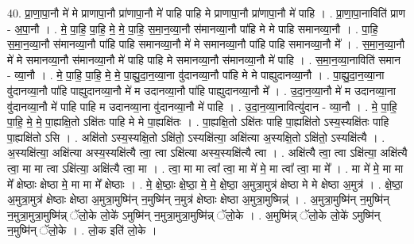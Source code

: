 \documentclass[17pt]{extarticle}
\begin{document}
40. प्रा॒णा॒पा॒नौ मे॑ मे प्राणापा॒नौ प्रा॑णापा॒नौ मे॑ पाहि पाहि मे प्राणापा॒नौ प्रा॑णापा॒नौ मे॑ पाहि । . प्रा॒णा॒पा॒नाविति॑ प्राण - अ॒पा॒नौ । . मे॒ पा॒हि॒ पा॒हि॒ मे॒ मे॒ पा॒हि॒ स॒मा॒न॒व्या॒नौ स॑मानव्या॒नौ पा॑हि मे मे पाहि समानव्या॒नौ । . पा॒हि॒ स॒मा॒न॒व्या॒नौ स॑मानव्या॒नौ पा॑हि पाहि समानव्या॒नौ मे॑ मे समानव्या॒नौ पा॑हि पाहि समानव्या॒नौ मे᳚ । . स॒मा॒न॒व्या॒नौ मे॑ मे समानव्या॒नौ स॑मानव्या॒नौ मे॑ पाहि पाहि मे समानव्या॒नौ स॑मानव्या॒नौ मे॑ पाहि । . स॒मा॒न॒व्या॒नाविति॑ समान - व्या॒नौ । . मे॒ पा॒हि॒ पा॒हि॒ मे॒ मे॒ पा॒ह्यु॒दा॒न॒व्या॒ना वु॑दानव्या॒नौ पा॑हि मे मे पाह्युदानव्या॒नौ । . पा॒ह्यु॒दा॒न॒व्या॒ना वु॑दानव्या॒नौ पा॑हि पाह्युदानव्या॒नौ मे॑ म उदानव्या॒नौ पा॑हि पाह्युदानव्या॒नौ मे᳚ । . उ॒दा॒न॒व्या॒नौ मे॑ म उदानव्या॒ना वु॑दानव्या॒नौ मे॑ पाहि पाहि म उदानव्या॒ना वु॑दानव्या॒नौ मे॑ पाहि । . उ॒दा॒न॒व्या॒नावित्यु॑दान - व्या॒नौ । . मे॒ पा॒हि॒ पा॒हि॒ मे॒ मे॒ पा॒ह्यक्षि॒तो ऽक्षि॑तः पाहि मे मे पा॒ह्यक्षि॑तः । . पा॒ह्यक्षि॒तो ऽक्षि॑तः पाहि पा॒ह्यक्षि॑तो ऽस्य॒स्यक्षि॑तः पाहि पा॒ह्यक्षि॑तो ऽसि । . अक्षि॑तो ऽस्य॒स्यक्षि॒तो ऽक्षि॑तो॒ ऽस्यक्षि॑त्या॒ अक्षि॑त्या अ॒स्यक्षि॒तो ऽक्षि॑तो॒ ऽस्यक्षि॑त्यै । . अ॒स्यक्षि॑त्या॒ अक्षि॑त्या अस्य॒स्यक्षि॑त्यै त्वा॒ त्वा ऽक्षि॑त्या अस्य॒स्यक्षि॑त्यै त्वा । . अक्षि॑त्यै त्वा॒ त्वा ऽक्षि॑त्या॒ अक्षि॑त्यै त्वा॒ मा मा त्वा ऽक्षि॑त्या॒ अक्षि॑त्यै त्वा॒ मा । . त्वा॒ मा मा त्वा᳚ त्वा॒ मा मे॑ मे॒ मा त्वा᳚ त्वा॒ मा मे᳚ । . मा मे॑ मे॒ मा मा मे᳚ क्षेष्ठाः क्षेष्ठा मे॒ मा मा मे᳚ क्षेष्ठाः । . मे॒ क्षे॒ष्ठाः॒ क्षे॒ष्ठा॒ मे॒ मे॒ क्षे॒ष्ठा॒ अ॒मुत्रा॒मुत्र॑ क्षेष्ठा मे मे क्षेष्ठा अ॒मुत्र॑ । . क्षे॒ष्ठा॒ अ॒मुत्रा॒मुत्र॑ क्षेष्ठाः क्षेष्ठा अ॒मुत्रा॒मुष्मि॑न् न॒मुष्मि॑न् न॒मुत्र॑ क्षेष्ठाः क्षेष्ठा अ॒मुत्रा॒मुष्मिन्न्॑ । . अ॒मुत्रा॒मुष्मि॑न् न॒मुष्मि॑न् न॒मुत्रा॒मुत्रा॒मुष्मि॑न्न् ॅलो॒के लो॒के॑ ऽमुष्मि॑न् न॒मुत्रा॒मुत्रा॒मुष्मि॑न्न् ॅलो॒के । . अ॒मुष्मि॑न्न् ॅलो॒के लो॒के॑ ऽमुष्मि॑न् न॒मुष्मि॑न् ॅलो॒के । . लो॒क इति॑ लो॒के । \newline
\pagebreak
{}
\end{document}
